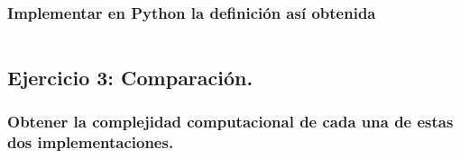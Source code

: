\documentclass[11pt]{article}
\makeatletter
\newcommand{\boxspacing}{\kern\kvtcb@left@rule\kern\kvtcb@boxsep}
\newcommand{\prompt}[4]{
        {\ttfamily\llap{{\color{#2}[#3]:\hspace{3pt}#4}}\vspace{-\baselineskip}}
    }
\makeatother
\begin{document}
    \subsubsection{Implementar en Python la definición así
obtenida}\label{implementar-en-python-la-definiciuxf3n-asuxed-obtenida}

    \begin{tcolorbox}[breakable, size=fbox, boxrule=1pt, pad at break*=1mm,colback=cellbackground, colframe=cellborder]
\prompt{In}{incolor}{ }{\boxspacing}
\begin{Verbatim}[commandchars=\\\{\}]

\end{Verbatim}
\end{tcolorbox}

    \subsection{Ejercicio 3:
Comparación.}\label{ejercicio-3-comparaciuxf3n.}

\subsubsection{Obtener la complejidad computacional de cada una de estas
dos
implementaciones.}\label{obtener-la-complejidad-computacional-de-cada-una-de-estas-dos-implementaciones.}
\end{document}
